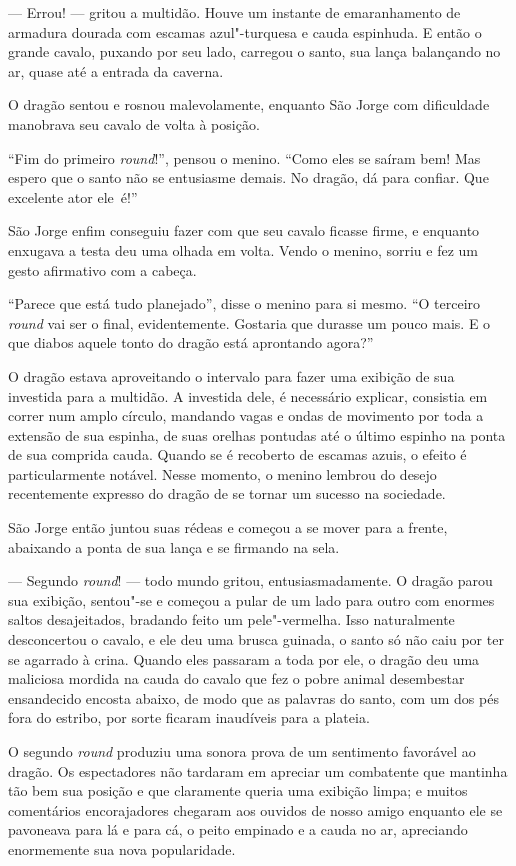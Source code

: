 --- Errou! --- gritou a multidão. Houve um instante de emaranhamento de
armadura dourada com escamas azul"-turquesa e cauda espinhuda. E então
o grande cavalo, puxando por seu lado, carregou o santo, sua lança
balançando no ar, quase até a entrada da caverna.

O dragão sentou e rosnou malevolamente, enquanto São Jorge com
dificuldade manobrava seu cavalo de volta à posição.

“Fim do primeiro \textit{round}!”, pensou o menino. “Como eles se saíram bem!
Mas espero que o santo não se entusiasme demais. No dragão, dá para
confiar. Que excelente ator \mbox{ele é!”}

São Jorge enfim conseguiu fazer com que seu cavalo ficasse firme, e
enquanto enxugava a testa deu uma olhada em volta. Vendo o menino,
sorriu e fez um gesto afirmativo com a cabeça.

“Parece que está tudo planejado”, disse o menino para si mesmo. “O
terceiro \textit{round} vai ser o final, evidentemente. Gostaria que durasse
um pouco mais. E o que diabos aquele tonto do dragão está aprontando
agora?”

O dragão estava aproveitando o intervalo para fazer uma exibição
de sua investida para a multidão. A investida dele, é necessário
explicar, consistia em correr num amplo círculo, mandando vagas e
ondas de movimento por toda a extensão de sua espinha, de suas
orelhas pontudas até o último espinho na ponta de sua comprida cauda.
Quando se é recoberto de escamas azuis, o efeito é particularmente
notável. Nesse momento, o menino lembrou do desejo recentemente expresso do dragão
de se tornar um sucesso na sociedade. 

São Jorge então juntou suas rédeas e começou a se mover para a frente,
abaixando a ponta de sua lança e se firmando na sela.

--- Segundo \textit{round}! --- todo mundo gritou, entusiasmadamente. O dragão
parou sua exibição, sentou"-se e começou a pular de um lado para outro
com enormes saltos desajeitados, bradando feito um pele"-vermelha.
Isso naturalmente desconcertou o cavalo, e ele deu uma brusca
guinada, o santo só não caiu por ter se agarrado à crina. Quando eles
passaram a toda por ele, o dragão deu uma maliciosa mordida na cauda do
cavalo que fez o pobre animal desembestar ensandecido encosta abaixo,
de modo que as palavras do santo, com um dos pés fora do estribo, por
sorte ficaram inaudíveis para a plateia.

O segundo \textit{round} produziu uma sonora prova de um sentimento favorável
ao dragão. Os espectadores não tardaram em apreciar um combatente que
mantinha tão bem sua posição e que claramente queria uma exibição
limpa; e muitos comentários encorajadores chegaram aos ouvidos de
nosso amigo enquanto ele se pavoneava para lá e para cá, o peito
empinado e a cauda no ar, apreciando enormemente sua nova
popularidade.

